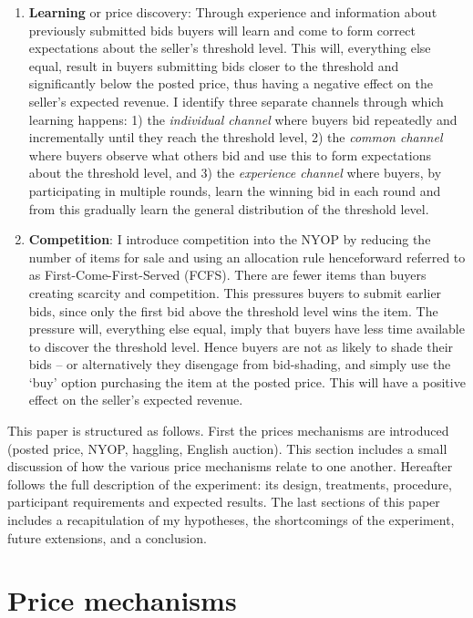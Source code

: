 \documentclass[a4paper,12pt]{article}
\begin{document}
	\begin{enumerate}
		\item {\bf Learning} or price discovery: Through experience and information about previously submitted bids buyers will learn and come to form correct expectations about the seller's threshold level. This will, everything else equal, result in buyers submitting bids closer to the threshold and significantly below the posted price, thus having a negative effect on the seller's expected revenue. I identify three separate channels through which learning happens: 1) the \emph{individual channel} where buyers bid repeatedly and incrementally until they reach the threshold level, 2) the \emph{common channel} where buyers observe what others bid and use this to form expectations about the threshold level, and 3) the \emph{experience channel} where buyers, by participating in multiple rounds, learn the winning bid in each round and from this gradually learn the general distribution of the threshold level.
	 	\item {\bf Competition}: I introduce competition into the NYOP by reducing the number of items for sale and using an allocation rule henceforward referred to as First-Come-First-Served (FCFS). There are fewer items than buyers creating scarcity and competition. This pressures buyers to submit earlier bids, since only the first bid above the threshold level wins the item. The pressure will, everything else equal, imply that buyers have less time available to discover the threshold level. Hence buyers are not as likely to shade their bids -- or alternatively they disengage from bid-shading, and simply use the `buy' option purchasing the item at the posted price. This will have a positive effect on the seller's expected revenue.
	\end{enumerate}

	This paper is structured as follows. First the prices mechanisms are introduced (posted price, NYOP, haggling, English auction). This section includes a small discussion of how the various price mechanisms relate to one another. Hereafter follows the full description of the experiment: its design, treatments, procedure, participant requirements and expected results. The last sections of this paper includes a recapitulation of my hypotheses, the shortcomings of the experiment, future extensions, and a conclusion.

	\section{Price mechanisms}
\end{document}
